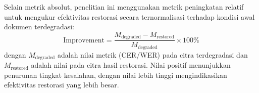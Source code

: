 \documentclass[12pt,a4paper]{article}
\begin{document}
Selain metrik absolut, penelitian ini menggunakan metrik peningkatan relatif untuk mengukur efektivitas restorasi secara ternormalisasi terhadap kondisi awal dokumen terdegradasi:
\begin{equation}
  \text{Improvement} = \frac{M_{\text{degraded}} - M_{\text{restored}}}{M_{\text{degraded}}} \times 100\%
  \label{eq:IV.21}
\end{equation}
dengan $M_{\text{degraded}}$ adalah nilai metrik (CER/WER) pada citra terdegradasi dan $M_{\text{restored}}$ adalah nilai pada citra hasil restorasi. Nilai positif menunjukkan penurunan tingkat kesalahan, dengan nilai lebih tinggi mengindikasikan efektivitas restorasi yang lebih besar.

\end{document}
